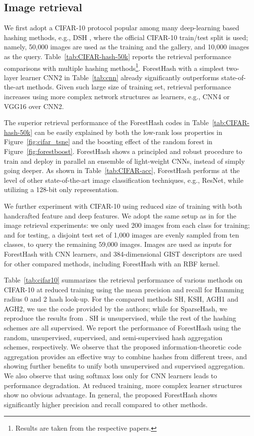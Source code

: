 \documentclass[runningheads]{llncs}
\begin{document}
\subsection{Image retrieval}
We first adopt a CIFAR-10 protocol popular among many deep-learning based
hashing methods, e.g., DSH \cite{DSH}, where the official CIFAR-10 train/test
split is used; namely, 50,000 images are used as the training and the gallery,
and 10,000 images as the query.  Table~\ref{tab:CIFAR-hash-50k} reports the
retrieval performance comparisons with multiple hashing methods\footnote{Results
  are taken from the respective papers.}. ForestHash with a simplest two-layer
learner {CNN2} in Table~\ref{tab:cnn} already significantly outperforms
state-of-the-art methods. Given such large size of training set, retrieval
performance increases using more complex network structures as learners, e.g.,
{CNN4} or {VGG16} over {CNN2}.


The superior retrieval performance of the ForestHash codes in
Table~\ref{tab:CIFAR-hash-50k} can be easily explained by both the low-rank loss
properties in Figure~\ref{fig:cifar_tsne} and the boosting effect of the random
forest in Figure~\ref{fig:forestboost}.  ForestHash shows a principled and
robust procedure to train and deploy in parallel an ensemble of light-weight
CNNs, instead of simply going deeper.  As shown in Table~\ref{tab:CIFAR-acc},
ForestHash performs at the level of other state-of-the-art image classification
techniques, e.g., ResNet, while utilizing a 128-bit only representation.


We further experiment with CIFAR-10 using reduced size of training with both handcrafted feature and deep features.  We adopt
the same setup as in \cite{KSH, sparsehash} for the image retrieval experiments:
we only used 200 images from each class for training; and for testing, a
disjoint test set of 1,000 images are evenly sampled from ten classes, to query
the remaining 59,000 images.  Images are used as inputs for ForestHash with CNN
learners, and 384-dimensional GIST descriptors are used for other compared
methods, including ForestHash with an RBF kernel.


Table~\ref{tab:cifar10} summarizes the retrieval performance of various methods
on CIFAR-10 at reduced training using the mean precision and recall for Hamming
radius 0 and 2 hash look-up.  For the compared methods SH, KSH, AGH1 and AGH2, we
use the code provided by the authors; while for SparseHash, we reproduce the
results from \cite{sparsehash}. SH is unsupervised, while the rest of the
hashing schemes are all supervised.  We report the performance of ForestHash
using the random, unsupervised, supervised, and semi-supervised hash aggregation
schemes, respectively.  We observe that the proposed information-theoretic code
aggregation provides an effective way to combine hashes from different trees,
and showing further benefits to unify both unsupervised and supervised
aggregation.  We also observe that using softmax loss only for CNN learners
leads to performance degradation.
 At reduced training, more complex learner
structures show no obvious advantage.  In general, the proposed ForestHash shows
significantly higher precision and recall compared to other methods.
\end{document}
